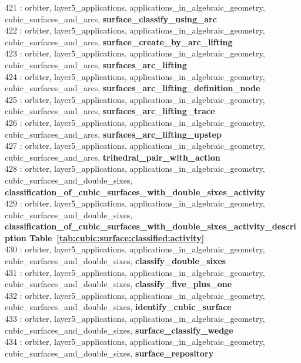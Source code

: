 421 : orbiter, layer5\_applications, applications\_in\_algebraic\_geometry, cubic\_surfaces\_and\_arcs, {\bf surface\_classify\_using\_arc}\\
422 : orbiter, layer5\_applications, applications\_in\_algebraic\_geometry, cubic\_surfaces\_and\_arcs, {\bf surface\_create\_by\_arc\_lifting}\\
423 : orbiter, layer5\_applications, applications\_in\_algebraic\_geometry, cubic\_surfaces\_and\_arcs, {\bf surfaces\_arc\_lifting}\\
424 : orbiter, layer5\_applications, applications\_in\_algebraic\_geometry, cubic\_surfaces\_and\_arcs, {\bf surfaces\_arc\_lifting\_definition\_node}\\
425 : orbiter, layer5\_applications, applications\_in\_algebraic\_geometry, cubic\_surfaces\_and\_arcs, {\bf surfaces\_arc\_lifting\_trace}\\
426 : orbiter, layer5\_applications, applications\_in\_algebraic\_geometry, cubic\_surfaces\_and\_arcs, {\bf surfaces\_arc\_lifting\_upstep}\\
427 : orbiter, layer5\_applications, applications\_in\_algebraic\_geometry, cubic\_surfaces\_and\_arcs, {\bf trihedral\_pair\_with\_action}\\
428 : orbiter, layer5\_applications, applications\_in\_algebraic\_geometry, cubic\_surfaces\_and\_double\_sixes, {\bf classification\_of\_cubic\_surfaces\_with\_double\_sixes\_activity}\\
429 : orbiter, layer5\_applications, applications\_in\_algebraic\_geometry, cubic\_surfaces\_and\_double\_sixes, {\bf classification\_of\_cubic\_surfaces\_with\_double\_sixes\_activity\_description Table~\ref{tab:cubic:surface:classified:activity}}\\
430 : orbiter, layer5\_applications, applications\_in\_algebraic\_geometry, cubic\_surfaces\_and\_double\_sixes, {\bf classify\_double\_sixes}\\
431 : orbiter, layer5\_applications, applications\_in\_algebraic\_geometry, cubic\_surfaces\_and\_double\_sixes, {\bf classify\_five\_plus\_one}\\
432 : orbiter, layer5\_applications, applications\_in\_algebraic\_geometry, cubic\_surfaces\_and\_double\_sixes, {\bf identify\_cubic\_surface}\\
433 : orbiter, layer5\_applications, applications\_in\_algebraic\_geometry, cubic\_surfaces\_and\_double\_sixes, {\bf surface\_classify\_wedge}\\
434 : orbiter, layer5\_applications, applications\_in\_algebraic\_geometry, cubic\_surfaces\_and\_double\_sixes, {\bf surface\_repository}\\

